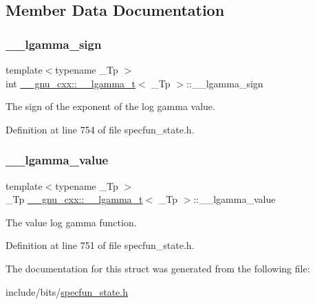 \subsection{Member Data Documentation}
\mbox{\label{struct____gnu__cxx_1_1____lgamma__t_a8aecdc9e5f69e729e96dc50f0c57b331}} 
\subsubsection{\texorpdfstring{\+\_\+\+\_\+lgamma\+\_\+sign}{\_\_lgamma\_sign}}
{\footnotesize\ttfamily template$<$typename \+\_\+\+Tp $>$ \\
int \hyperlink{struct____gnu__cxx_1_1____lgamma__t}{\+\_\+\+\_\+gnu\+\_\+cxx\+::\+\_\+\+\_\+lgamma\+\_\+t}$<$ \+\_\+\+Tp $>$\+::\+\_\+\+\_\+lgamma\+\_\+sign}



The sign of the exponent of the log gamma value. 



Definition at line 754 of file specfun\+\_\+state.\+h.

\mbox{\label{struct____gnu__cxx_1_1____lgamma__t_a916af5560acafd8dcf25c42fd28deef5}} 
\subsubsection{\texorpdfstring{\+\_\+\+\_\+lgamma\+\_\+value}{\_\_lgamma\_value}}
{\footnotesize\ttfamily template$<$typename \+\_\+\+Tp $>$ \\
\+\_\+\+Tp \hyperlink{struct____gnu__cxx_1_1____lgamma__t}{\+\_\+\+\_\+gnu\+\_\+cxx\+::\+\_\+\+\_\+lgamma\+\_\+t}$<$ \+\_\+\+Tp $>$\+::\+\_\+\+\_\+lgamma\+\_\+value}



The value log gamma function. 



Definition at line 751 of file specfun\+\_\+state.\+h.



The documentation for this struct was generated from the following file\+:\begin{DoxyCompactItemize}
\item 
include/bits/\hyperlink{specfun__state_8h}{specfun\+\_\+state.\+h}\end{DoxyCompactItemize}

